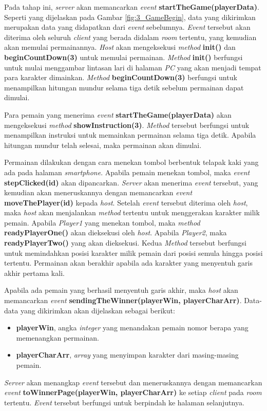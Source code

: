 Pada tahap ini, \textit{server} akan memancarkan \textit{event} \textbf{startTheGame(playerData)}. Seperti yang dijelaskan pada Gambar \ref{fig:3_GameBegin}, data yang dikirimkan merupakan data yang didapatkan dari \textit{event} sebelumnya. \textit{Event} tersebut akan diterima oleh seluruh \textit{client} yang berada didalam \textit{room} tertentu, yang kemudian akan memulai permainannya. \textit{Host} akan mengeksekusi \textit{method} \textbf{init()} dan \textbf{beginCountDown(3)} untuk memulai permainan. \textit{Method} \textbf{init()} berfungsi untuk mulai menggambar lintasan lari di halaman \textit{PC} yang akan menjadi tempat para karakter dimainkan. \textit{Method} \textbf{beginCountDown(3)} berfungsi untuk menampilkan hitungan mundur selama tiga detik sebelum permainan dapat dimulai. 

Para pemain yang menerima \textit{event} \textbf{startTheGame(playerData)} akan mengeksekusi \textit{method} \textbf{showInstruction(3)}. \textit{Method} tersebut berfungsi untuk menampilkan instruksi untuk memainkan permainan selama tiga detik. Apabila hitungan mundur telah selesai, maka permainan akan dimulai.

Permainan dilakukan dengan cara menekan tombol berbentuk telapak kaki yang ada pada halaman \textit{smartphone}. Apabila pemain menekan tombol, maka \textit{event} \textbf{stepClicked(id)} akan dipancarkan. \textit{Server} akan menerima \textit{event} tersebut, yang kemudian akan meneruskannya dengan memancarkan \textit{event} \textbf{moveThePlayer(id)} kepada \textit{host}. Setelah \textit{event} tersebut diterima oleh \textit{host}, maka \textit{host} akan menjalankan \textit{method} tertentu untuk menggerakan karakter milik pemain. Apabila \textit{Player1} yang menekan tombol, maka \textit{method} \textbf{readyPlayerOne()} akan dieksekusi oleh \textit{host}. Apabila \textit{Player2}, maka \textbf{readyPlayerTwo()} yang akan dieksekusi. Kedua \textit{Method} tersebut berfungsi untuk memindahkan posisi karakter milik pemain dari posisi semula hingga posisi tertentu. Permainan akan berakhir apabila ada karakter yang menyentuh garis akhir pertama kali.

Apabila ada pemain yang berhasil menyentuh garis akhir, maka \textit{host} akan memancarkan \textit{event} \textbf{sendingTheWinner(playerWin, playerCharArr)}. Data-data yang dikirimkan akan dijelaskan sebagai berikut:
\begin{itemize}
	\item \textbf{playerWin}, angka \textit{integer} yang menandakan pemain nomor berapa yang memenangkan permainan.
	\item \textbf{playerCharArr}, \textit{array} yang menyimpan karakter dari masing-masing pemain.
\end{itemize}
\textit{Server} akan menangkap \textit{event} tersebut dan meneruskannya dengan memancarkan \textit{event} \textbf{toWinnerPage(playerWin, playerCharArr)} ke setiap \textit{client} pada \textit{room} tertentu. \textit{Event} tersebut berfungsi untuk berpindah ke halaman selanjutnya.

